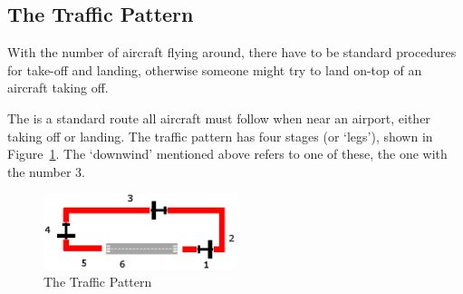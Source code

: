 \subsection{The Traffic Pattern}

With the number of aircraft flying around, there have to be standard procedures
for take-off and landing, otherwise someone might try to land on-top of an aircraft taking off.

The  is a standard route all aircraft must follow when
near an airport, either taking off or landing. The traffic pattern has four
stages (or `legs'), shown in Figure~\ref{pattern}. The `downwind' mentioned
above refers to one of these, the one with the number 3.

\begin{figure}[!htp]
\centering
\includegraphics[width=0.5\textwidth]{pattern}
\caption{The Traffic Pattern\label{pattern}}
\end{figure}

